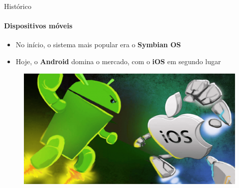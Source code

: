 \documentclass{beamer}
\begin{document}
\begin{frame}{Histórico}
	\framesubtitle{Dispositivos móveis}
	\begin{itemize}
		\item No início, o sistema mais popular era o \textbf{Symbian OS}
		\item Hoje, o \textbf{Android} domina o mercado, com o \textbf{iOS} em segundo lugar
	\end{itemize}
	\begin{figure}
		\includegraphics[width=0.6\paperwidth]{resources/android-ios}
	\end{figure}
\end{frame}
\end{document}
